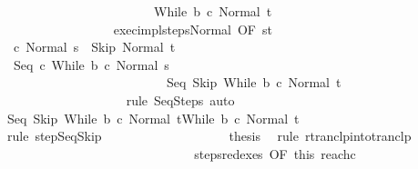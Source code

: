 \begin{isabellebody}
\ \ \ \ \ \ \ \ \ \ \ \ \ \ \ \ \ \ \ \ \ \ \ \ {\isacharparenleft}While\ b\ c{\isacharcomma}\ Normal\ t{\isacharparenright}{\isachardoublequoteclose}\isanewline
\ \ \ \ \ \ \ \ \ \ \ \ \ \ \isamarkupfalse%
\ {\isacharminus}\isanewline
\ \ \ \ \ \ \ \ \ \ \ \ \ \ \ \ \isamarkupfalse%
\ exec{\isacharunderscore}impl{\isacharunderscore}steps{\isacharunderscore}Normal\ {\isacharbrackleft}OF\ s{\isacharunderscore}t{\isacharbrackright}\isanewline
\ \ \ \ \ \ \ \ \ \ \ \ \ \ \ \ \isamarkupfalse%
\ {\isachardoublequoteopen}{\isasymGamma}{\isasymturnstile}\ {\isacharparenleft}c{\isacharcomma}\ Normal\ s{\isacharparenright}\ {\isasymrightarrow}\isactrlsup {\isacharasterisk}\ {\isacharparenleft}Skip{\isacharcomma}\ Normal\ t{\isacharparenright}{\isachardoublequoteclose}\isacommand{{\isachardot}}\isamarkupfalse%
\isanewline
\ \ \ \ \ \ \ \ \ \ \ \ \ \ \ \ \isamarkupfalse%
\ {\isachardoublequoteopen}{\isasymGamma}{\isasymturnstile}\ {\isacharparenleft}Seq\ c\ {\isacharparenleft}While\ b\ c{\isacharparenright}{\isacharcomma}\ Normal\ s{\isacharparenright}\ {\isasymrightarrow}\isactrlsup {\isacharasterisk}\ \isanewline
\ \ \ \ \ \ \ \ \ \ \ \ \ \ \ \ \ \ \ \ \ \ \ \ \ \ {\isacharparenleft}Seq\ Skip\ {\isacharparenleft}While\ b\ c{\isacharparenright}{\isacharcomma}\ Normal\ t{\isacharparenright}{\isachardoublequoteclose}\isanewline
\ \ \ \ \ \ \ \ \ \ \ \ \ \ \ \ \ \ \isamarkupfalse%
\ {\isacharparenleft}rule\ SeqSteps{\isacharparenright}\ auto\isanewline
\ \ \ \ \ \ \ \ \ \ \ \ \ \ \ \ \isamarkupfalse%
\isanewline
\ \ \ \ \ \ \ \ \ \ \ \ \ \ \ \ \isamarkupfalse%
\ {\isachardoublequoteopen}{\isasymGamma}{\isasymturnstile}{\isacharparenleft}Seq\ Skip\ {\isacharparenleft}While\ b\ c{\isacharparenright}{\isacharcomma}\ Normal\ t{\isacharparenright}{\isasymrightarrow}{\isacharparenleft}While\ b\ c{\isacharcomma}\ Normal\ t{\isacharparenright}{\isachardoublequoteclose}\isanewline
\ \ \ \ \ \ \ \ \ \ \ \ \ \ \ \ \ \ \isamarkupfalse%
\ {\isacharparenleft}rule\ step{\isachardot}SeqSkip{\isacharparenright}\isanewline
\ \ \ \ \ \ \ \ \ \ \ \ \ \ \ \ \isamarkupfalse%
\ \isamarkupfalse%
\ {\isacharquery}thesis\ \isamarkupfalse%
\ {\isacharparenleft}rule\ rtranclp{\isacharunderscore}into{\isacharunderscore}tranclp{}{\isacharparenright}\isanewline
\ \ \ \ \ \ \ \ \ \ \ \ \ \ \isamarkupfalse%
\isanewline
\ \ \ \ \ \ \ \ \ \ \ \ \ \ \isamarkupfalse%
\ steps{\isacharunderscore}redexes{\isacharprime}\ {\isacharbrackleft}OF\ this\ reach{\isacharunderscore}c\ {\isacharparenleft}{}{\isacharparenright}{\isacharbrackright}\ \ \isanewline

\end{isabellebody}
